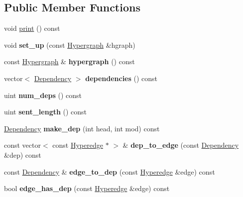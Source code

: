 \subsection*{Public Member Functions}
\begin{DoxyCompactItemize}
\item 
void \hyperlink{classDepParser_a9aebbbde821bad423b6c01cc12f02a2c}{print} () const 
\item 
\hypertarget{classDepParser_a6131e95a8ec7b07f7a4d68dae224d52f}{
void {\bfseries set\_\-up} (const \hyperlink{classHypergraph}{Hypergraph} \&hgraph)}
\label{classDepParser_a6131e95a8ec7b07f7a4d68dae224d52f}

\item 
\hypertarget{classDepParser_aaec31758432c2d3336d2164996571688}{
const \hyperlink{classHypergraph}{Hypergraph} \& {\bfseries hypergraph} () const }
\label{classDepParser_aaec31758432c2d3336d2164996571688}

\item 
\hypertarget{classDepParser_aa64f67830bf4c3bf9936ba6056dfdff0}{
vector$<$ \hyperlink{structDependency}{Dependency} $>$ {\bfseries dependencies} () const }
\label{classDepParser_aa64f67830bf4c3bf9936ba6056dfdff0}

\item 
\hypertarget{classDepParser_aaff55cf38fd9b1fbfb22090ddeb72ba8}{
uint {\bfseries num\_\-deps} () const }
\label{classDepParser_aaff55cf38fd9b1fbfb22090ddeb72ba8}

\item 
\hypertarget{classDepParser_a86b99d09d76b7d6f8733b208e9f32822}{
uint {\bfseries sent\_\-length} () const }
\label{classDepParser_a86b99d09d76b7d6f8733b208e9f32822}

\item 
\hypertarget{classDepParser_a49afcb1a83a3c924869faf34cd9e968e}{
\hyperlink{structDependency}{Dependency} {\bfseries make\_\-dep} (int head, int mod) const }
\label{classDepParser_a49afcb1a83a3c924869faf34cd9e968e}

\item 
\hypertarget{classDepParser_a9fa2f0bf24cd870404f0a99b5926c558}{
const vector$<$ const \hyperlink{classScarab_1_1HG_1_1Hyperedge}{Hyperedge} $\ast$ $>$ \& {\bfseries dep\_\-to\_\-edge} (const \hyperlink{structDependency}{Dependency} \&dep) const }
\label{classDepParser_a9fa2f0bf24cd870404f0a99b5926c558}

\item 
\hypertarget{classDepParser_aa5ff87f99326c60633fb8e26d1737776}{
const \hyperlink{structDependency}{Dependency} \& {\bfseries edge\_\-to\_\-dep} (const \hyperlink{classScarab_1_1HG_1_1Hyperedge}{Hyperedge} \&edge) const }
\label{classDepParser_aa5ff87f99326c60633fb8e26d1737776}

\item 
\hypertarget{classDepParser_abd0b9171e59c1c40cdb58807a46a5449}{
bool {\bfseries edge\_\-has\_\-dep} (const \hyperlink{classScarab_1_1HG_1_1Hyperedge}{Hyperedge} \&edge) const }
\label{classDepParser_abd0b9171e59c1c40cdb58807a46a5449}

\end{DoxyCompactItemize}
